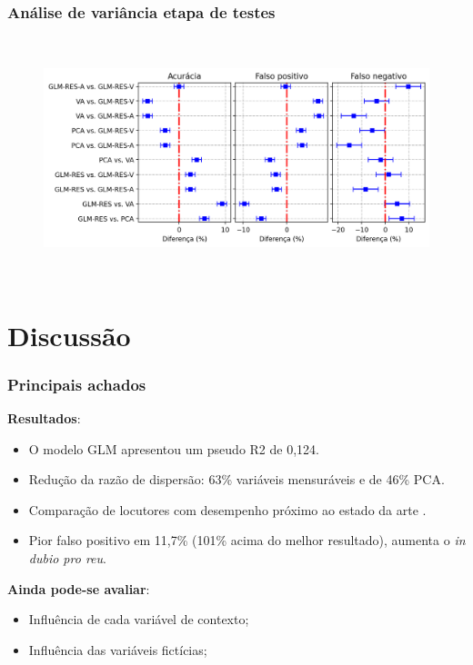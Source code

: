 \documentclass[121pt, aspectratio=169, t]{beamer}
\begin{document}
\begin{frame}[fragile=singleslide]
	\frametitle{Análise de variância etapa de testes}
	\begin{figure}
		\centering
		\includegraphics[height=7cm]{ANOVA_Acuracis_00.png}
	\end{figure}
\end{frame}



\section{Discussão}
\begin{frame}[fragile=singleslide]
	\frametitle{Principais achados}
	\textbf{Resultados}:
	\begin{itemize}
		\item O modelo GLM apresentou um pseudo R2 de 0,124.
		\item Redução da razão de dispersão: 63\% variáveis mensuráveis e de 46\% PCA. 
		\item Comparação de locutores com desempenho próximo ao estado da arte \cite{Sztaho2023,Ishihara2021}.
		\item Pior falso positivo em 11,7\% (101\% acima do melhor resultado), aumenta o \textit{in dubio pro reu}.
	\end{itemize}
	
	\textbf{Ainda pode-se avaliar}:
	\begin{itemize}
		\item Influência de cada variável de contexto;
		\item Influência das variáveis fictícias;
	\end{itemize}
\end{frame}
\end{document}
